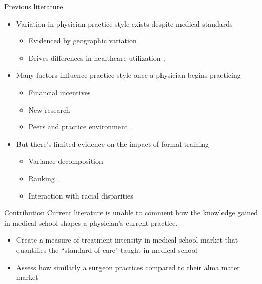 \documentclass[10pt,aspectratio=169]{beamer}
\begin{document}
\begin{frame}{Previous literature}
    \begin{itemize}
        \item Variation in physician practice style exists despite medical standards
            \begin{itemize}
                \item Evidenced by geographic variation \textcolor{gray}{\scriptsize\textcite{finkelstein_sources_2016}}
                \item Drives differences in healthcare utilization \textcolor{gray}{\scriptsize\textcite{badinski_geographic_2023}, \textcite{cutler_physician_2019}}
            \end{itemize}
        
        \vspace{2.5mm}
        \item Many factors influence practice style once a physician begins practicing 
            \begin{itemize}
                \item Financial incentives \textcolor{gray}{\scriptsize\textcite{clemens_physicians_2014}}
                \item New research \textcolor{gray}{\scriptsize\textcite{decicca_how_2024}}
                \item Peers and practice environment \textcolor{gray}{\scriptsize\textcite{epstein_formation_2009}, \textcite{molitor_evolution_2018}}
            \end{itemize}

        \vspace{2.5mm}
        \item But there's limited evidence on the impact of formal training
            \begin{itemize}
                \item Variance decomposition \textcolor{gray}{\scriptsize\textcite{epstein_formation_2009}}
                \item Ranking \textcolor{gray}{\scriptsize\textcite{doyle_returns_2010}, \textcite{schnell_addressing_2018}}
                \item Interaction with racial disparities \textcolor{gray}{\scriptsize\textcite{kissel_role_2025}}
            \end{itemize}
    \end{itemize}
\end{frame}

\begin{frame}{Contribution}
    Current literature is unable to comment how the knowledge gained in medical school shapes a physician's current practice.
    \begin{itemize} 
        \item[$\to$] Create a measure of treatment intensity in medical school market that quantifies the ``standard of care" taught in medical school
        \item[$\to$] Assess how similarly a surgeon practices compared to their alma mater market
    \end{itemize}

    
\end{frame}
\end{document}
